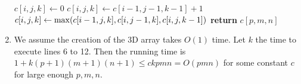 \documentclass[12pt,a4paper]{article}
\begin{document}
\begin{enumerate}
\begin{algorithm}[h!]
\begin{algorithmic}[1]
									\State $c[i,j,k] \gets 0$
									\State $c[i,j,k] \gets c[i-1,j-1,k-1] + 1$
								\Else
									\State $c[i,j,k] \gets \max\parens*{c[i-1,j,k], c[i,j-1,k], c[i,j,k-1]}$
								\EndIf
							\EndFor
						\EndFor
					\EndFor
					\State \textbf{return} $c[p,m,n]$
				\EndFunction
			\end{algorithmic}
		\end{algorithm}

		\item We assume the creation of the 3D array takes $O(1)$ time. Let $k$ the time to execute lines 6 to 12. Then the running time is $1 + k(p+1)(m+1)(n+1) \le ckpmn = O(pmn)$ for some constant $c$ for large enough $p,m,n$.
	\end{enumerate}

\clearpage
\newpage
\end{document}
